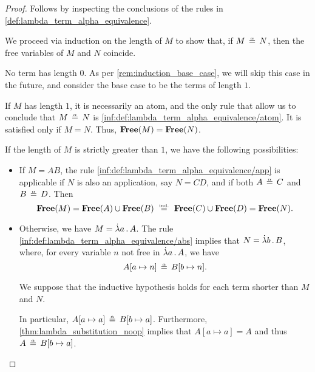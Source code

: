 \begin{proof}
   Follows by inspecting the conclusions of the rules in \cref{def:lambda_term_alpha_equivalence}.

   We proceed via induction on the length of \( M \) to show that, if \( M \aequiv N \), then the free variables of \( M \) and \( N \) coincide.

  No term has length \( 0 \). As per \cref{rem:induction_base_case}, we will skip this case in the future, and consider the base case to be the terms of length \( 1 \).

  If \( M \) has length \( 1 \), it is necessarily an atom, and the only rule that allow us to conclude that \( M \aequiv N \) is \ref{inf:def:lambda_term_alpha_equivalence/atom}. It is satisfied only if \( M = N \). Thus, \( \op*{Free}(M) = \op*{Free}(N) \).

  If the length of \( M \) is strictly greater than \( 1 \), we have the following possibilities:
  \begin{itemize}
    \item If \( M = AB \), the rule \ref{inf:def:lambda_term_alpha_equivalence/app} is applicable if \( N \) is also an application, say \( N = CD \), and if both \( A \aequiv C \) and \( B \aequiv D \). Then
    \begin{equation*}
      \op*{Free}(M)
      =
      \op*{Free}(A) \cup \op*{Free}(B)
      \reloset{\T{ind.}} =
      \op*{Free}(C) \cup \op*{Free}(D)
      =
      \op*{Free}(N).
    \end{equation*}

    \item Otherwise, we have \( M = \qabs a A \). The rule \ref{inf:def:lambda_term_alpha_equivalence/abs} implies that \( N = \qabs b B \), where, for every variable \( n \) not free in \( \qabs a A \), we have
    \begin{equation*}
      A[a \mapsto n] \aequiv B[b \mapsto n].
    \end{equation*}

    We suppose that the inductive hypothesis holds for each term shorter than \( M \) and \( N \).

    In particular, \( A[a \mapsto a] \aequiv B[b \mapsto a] \). Furthermore, \cref{thm:lambda_substitution_noop} implies that \( A[a \mapsto a] = A \) and thus \( A \aequiv B[b \mapsto a] \).


\end{itemize}
\end{proof}
